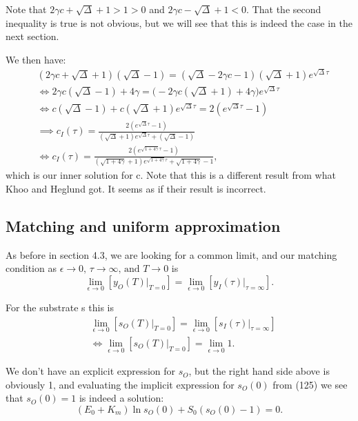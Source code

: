\documentclass[12pt]{article}
\begin{document}
Note that $2 \gamma c + \sqrt{\Delta} + 1 > 1 > 0$ and
$2 \gamma c - \sqrt{\Delta} + 1 < 0$. That the second inequality is
true is not obvious, but we will see that this is indeed the case in
the next section.

We then have:
\begin{align}
&(2\gamma c + \sqrt{\Delta} + 1)(\sqrt{\Delta} - 1) =
   (\sqrt{\Delta} - 2\gamma c - 1)(\sqrt{\Delta} + 1) e^{\sqrt{\Delta} \tau} \\
&\iff 2\gamma c (\sqrt{\Delta} - 1) + 4 \gamma =
  \Big( -2\gamma c(\sqrt{\Delta} + 1) + 4\gamma \Big) e^{\sqrt{\Delta} \tau} \\
&\iff c (\sqrt{\Delta} - 1) + c (\sqrt{\Delta} + 1) e^{\sqrt{\Delta} \tau} =
   2(e^{\sqrt{\Delta} \tau} - 1) \\
&\implies c_I(\tau) =
  \frac{2(e^{\sqrt{\Delta} \tau} - 1)}
       {  (\sqrt{\Delta} + 1) e^{\sqrt{\Delta} \tau} + (\sqrt{\Delta} - 1)} \\
&\iff c_I(\tau) =
  \frac{2(e^{\sqrt{1+4\gamma} \tau} - 1)}
       {(\sqrt{1+4\gamma} + 1) e^{\sqrt{1+4\gamma} \tau} + \sqrt{1+4\gamma} - 1},
\end{align}
which is our inner solution for c. Note that this is a different
result from what Khoo and Heglund got. It seems as if their result is
incorrect.

\subsection{Matching and uniform approximation}

As before in section 4.3, we are looking for a common limit, and our
matching condition as
$\epsilon \to 0 \text{, } \tau \to \infty \text{, and } T \to 0$ is
\begin{equation}
\lim_{\epsilon \to 0} [y_O(T) |_{T=0}] =
\lim_{\epsilon \to 0} [y_I(\tau) |_{\tau=\infty}].
\end{equation}

For the substrate s this is
\begin{align}
&\lim_{\epsilon \to 0} [s_O(T) |_{T=0}] =
  \lim_{\epsilon \to 0} [s_I(\tau) |_{\tau=\infty}] \\
&\iff \lim_{\epsilon \to 0} [s_O(T) |_{T=0}] =
  \lim_{\epsilon \to 0} 1.
\end{align}

We don't have an explicit expression for $s_O$, but the right hand
side above is obviously 1, and evaluating the implicit expression for
$s_O(0)$ from (125) we see that $s_O(0)=1$ is indeed a solution:
\begin{equation}
(E_0+K_m) \ln{s_O(0)} + S_0 (s_O(0) - 1) = 0.
\end{equation}
\end{document}
